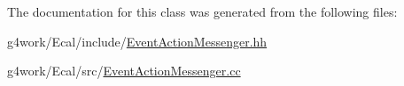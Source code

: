 The documentation for this class was generated from the following files\-:\begin{DoxyCompactItemize}
\item 
g4work/\-Ecal/include/\hyperlink{_event_action_messenger_8hh}{Event\-Action\-Messenger.\-hh}\item 
g4work/\-Ecal/src/\hyperlink{_event_action_messenger_8cc}{Event\-Action\-Messenger.\-cc}\end{DoxyCompactItemize}
